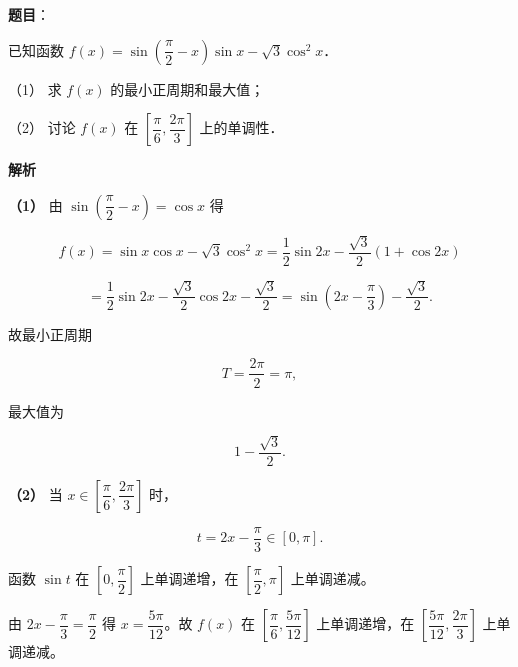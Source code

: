 \begin{answer}

\textbf{题目}：

已知函数 $f(x)=\sin\left(\dfrac{\pi}{2}-x\right)\sin x-\sqrt{3}\cos^{2}x$．

（1） 求 $f(x)$ 的最小正周期和最大值；

（2） 讨论 $f(x)$ 在 $\left[\dfrac{\pi}{6},\dfrac{2\pi}{3}\right]$ 上的单调性．

\textbf{解析}

\textbf{（1）} 由 $\sin\left(\dfrac{\pi}{2}-x\right)=\cos x$ 得

\nopagebreak[4]
\[
f(x)=\sin x\cos x-\sqrt{3}\cos^{2}x
=\frac{1}{2}\sin 2x-\frac{\sqrt{3}}{2}(1+\cos 2x)
\]

\nopagebreak[4]
\[
=\frac{1}{2}\sin 2x-\frac{\sqrt{3}}{2}\cos 2x-\frac{\sqrt{3}}{2}
=\sin\left(2x-\frac{\pi}{3}\right)-\frac{\sqrt{3}}{2}.
\]

故最小正周期

\nopagebreak[4]
\[
T=\frac{2\pi}{2}=\pi,
\]

最大值为

\nopagebreak[4]
\[
1-\frac{\sqrt{3}}{2}.
\]

\textbf{（2）} 当 $x\in\left[\dfrac{\pi}{6},\dfrac{2\pi}{3}\right]$ 时，

\nopagebreak[4]
\[
t=2x-\frac{\pi}{3}\in[0,\pi].
\]

函数 $\sin t$ 在 $\left[0,\dfrac{\pi}{2}\right]$ 上单调递增，在 $\left[\dfrac{\pi}{2},\pi\right]$ 上单调递减。

由 $2x-\dfrac{\pi}{3}=\dfrac{\pi}{2}$ 得 $x=\dfrac{5\pi}{12}$。故 $f(x)$ 在 $\left[\dfrac{\pi}{6},\dfrac{5\pi}{12}\right]$ 上单调递增，在 $\left[\dfrac{5\pi}{12},\dfrac{2\pi}{3}\right]$ 上单调递减。



\end{answer}
